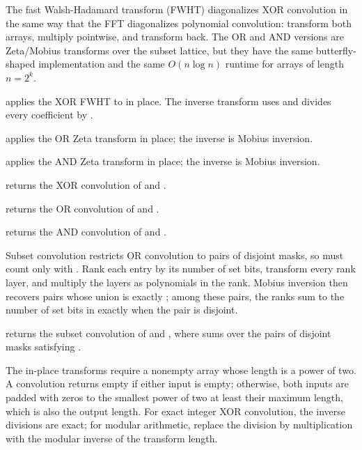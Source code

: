 The fast Walsh-Hadamard transform (FWHT) diagonalizes XOR convolution in the same way that the FFT diagonalizes polynomial convolution: transform both arrays, multiply pointwise, and transform back. The OR and AND versions are Zeta/Mobius transforms over the subset lattice, but they have the same butterfly-shaped implementation and the same $O(n \log n)$ runtime for arrays of length $n = 2^k$.

\begin{compactitem}
  \item {} applies the XOR FWHT to  in place. The inverse transform uses  and divides every coefficient by .
  \item {} applies the OR Zeta transform in place; the inverse is Mobius inversion.
  \item {} applies the AND Zeta transform in place; the inverse is Mobius inversion.
  \item {} returns the XOR convolution of  and .
  \item {} returns the OR convolution of  and .
  \item {} returns the AND convolution of  and .
\end{compactitem}

Subset convolution restricts OR convolution to pairs of disjoint masks, so  must count only  with . Rank each entry by its number of set bits, transform every rank layer, and multiply the layers as polynomials in the rank. Mobius inversion then recovers pairs whose union is exactly ; among these pairs, the ranks sum to the number of set bits in  exactly when the pair is disjoint.

\begin{compactitem}
  \item {} returns the subset convolution of  and , where  sums  over the pairs of disjoint masks satisfying .
\end{compactitem}

The in-place transforms require a nonempty array whose length is a power of two. A convolution returns empty if either input is empty; otherwise, both inputs are padded with zeros to the smallest power of two at least their maximum length, which is also the output length. For exact integer XOR convolution, the inverse divisions are exact; for modular arithmetic, replace the division by multiplication with the modular inverse of the transform length.

